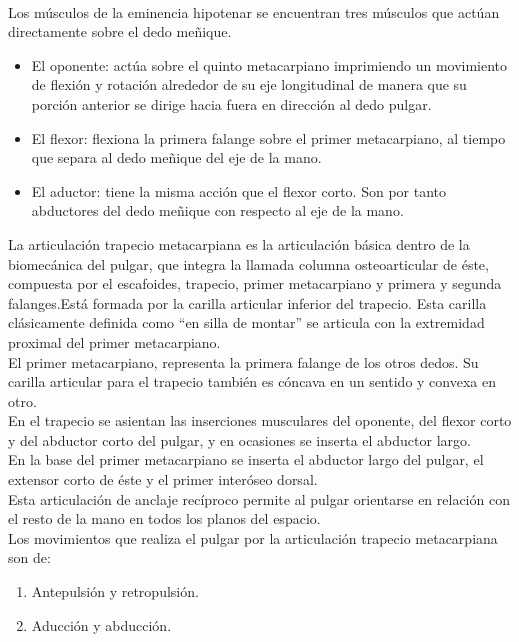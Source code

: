 \documentclass{article}
\begin{document}
\\
Los músculos de la eminencia hipotenar se encuentran tres músculos que actúan directamente sobre el dedo meñique. 
\\
\begin{itemize}
  \item     El oponente: actúa sobre el quinto metacarpiano imprimiendo un movimiento de flexión y rotación alrededor de su eje longitudinal de manera que su porción anterior se dirige hacia fuera en dirección al dedo pulgar.  \\
   \item	El flexor: flexiona la primera falange sobre el primer metacarpiano, al tiempo que separa al dedo meñique del eje de la mano.  \\
   \item	El aductor: tiene la misma acción que el flexor corto. Son por tanto abductores del dedo meñique con respecto al eje de la mano.  \\
\end{itemize}


La articulación trapecio metacarpiana es la articulación básica dentro de la biomecánica del pulgar, que integra la llamada columna osteoarticular de éste, compuesta por el escafoides, trapecio, primer metacarpiano y primera y segunda falanges.Está formada por la carilla articular inferior del trapecio. Esta carilla clásicamente definida como “en silla de montar” se articula con la extremidad proximal del primer metacarpiano.
\\
El primer metacarpiano, representa la primera falange de los otros dedos. Su carilla articular para el trapecio también es cóncava en un sentido y convexa en otro.
\\
En el trapecio se asientan las inserciones musculares del oponente, del flexor corto y del abductor corto del pulgar, y en ocasiones se inserta el abductor largo. 
\\
En la base del primer metacarpiano se inserta el abductor largo del pulgar, el extensor corto de éste y el primer interóseo dorsal. 
\\
Esta articulación de anclaje recíproco permite al pulgar orientarse en relación con el resto de la mano en todos los planos del espacio.
\\
Los movimientos que realiza el pulgar por la articulación trapecio metacarpiana son de:

\begin{enumerate}
  \item     Antepulsión y retropulsión.\\
   \item	Aducción y abducción.\\
\end{enumerate}
\end{document}
